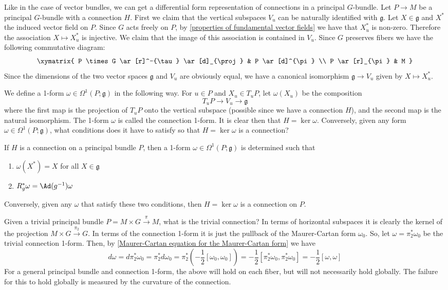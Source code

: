 Like in the case of vector bundles, we can get a differential form representation of connections in a principal $G$-bundle. Let $P \rightarrow M$ be a principal $G$-bundle with a connection $H$. First we claim that the vertical subspaces $V_u$ can be naturally identified with $\mathfrak g$. Let $X \in \mathfrak g$ and $X^*$ the induced vector field on $P$. Since $G$ acts freely on $P$, by \cref{properties of fundamental vector fields} we have that $X_u^*$ is non-zero. Therefore the association $X \mapsto X_u^*$ is injective. We claim that the image of this association is contained in $V_u$. Since $G$ preserves fibers we have the following commutative diagram:
\[
\xymatrix
{
	P \times G \ar[r]^-{\tau} \ar[d]_{\proj} & P \ar[d]^{\pi} \\
	P \ar[r]_{\pi} & M 
}
\]
\unfinished
Since the dimensions of the two vector spaces $\mathfrak g$ and $V_u$ are obviously equal, we have a canonical isomorphism $\mathfrak g \rightarrow V_u$ given by $X \mapsto X_u^*$. 

We define a 1-form $\omega \in \Omega^1(P;\mathfrak g)$ in the following way. For $u \in P$ and $X_u \in T_u P$, let $\omega(X_u)$ be the composition
\[ T_u P \longrightarrow V_u \longrightarrow \mathfrak g \]
where the first map is the projection of $T_u P$ onto the vertical subspace (possible since we have a connection $H$), and the second map is the natural isomorphism. The 1-form $\omega$ is called the connection 1-form. It is clear then that $H = \ker \omega$. Conversely, given any form $\omega \in \Omega^1(P;\mathfrak g)$, what conditions does it have to satisfy so that $H = \ker \omega$ is a connection?

\begin{prop}
If $H$ is a connection on a principal bundle $P$, then a 1-form $\omega \in \Omega^1(P;\mathfrak g)$ is determined such that
\begin{enumerate}
	\item $\omega(X^*) = X$ for all $X \in \mathfrak g$
	\item $R_g^* \omega = \Ad(g^{-1}) \omega$
\end{enumerate}
Conversely, given any $\omega$ that satisfy these two conditions, then $H = \ker \omega$ is a connection on $P$.
\end{prop}

Given a trivial principal bundle $P = M \times G \stackrel{\pi}{\rightarrow} M$, what is the trivial connection? In terms of horizontal subspaces it is clearly the kernel of the projection $M \times G \stackrel{\pi_2}{\rightarrow} G$. In terms of the connection 1-form it is just the pullback of the Maurer-Cartan form $\omega_0$. So, let $\omega = \pi_2^* \omega_0$ be the trivial connection 1-form. Then, by \eqref{Maurer-Cartan equation for the Maurer-Cartan form} we have 
\[ d\omega = d \pi_2^* \omega_0 = \pi_2^* d\omega_0 = \pi_2^*\left( -\frac{1}{2} [\omega_0,\omega_0] \right) = -\frac{1}{2} [\pi_2^*\omega_0,\pi_2^*\omega_0] = -\frac{1}{2} [\omega,\omega] \]
For a general principal bundle and connection 1-form, the above will hold on each fiber, but will not necessarily hold globally. The failure for this to hold globally is measured by the curvature of the connection.

